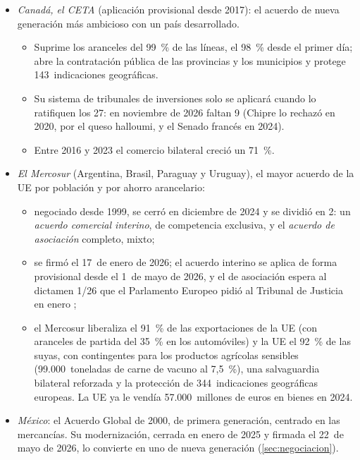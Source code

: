 \documentclass[11pt]{article}
\begin{document}
\begin{itemize}
\item \emph{Canadá, el CETA} (aplicación provisional desde 2017): el acuerdo de nueva generación más ambicioso con un país desarrollado.
  \begin{itemize}
  \item Suprime los aranceles del 99~\% de las líneas, el 98~\% desde el primer día; abre la contratación pública de las provincias y los municipios y protege 143~indicaciones geográficas.
  \item Su sistema de tribunales de inversiones solo se aplicará cuando lo ratifiquen los 27: en noviembre de 2026 faltan 9 (Chipre lo rechazó en 2020, por el queso halloumi, y el Senado francés en 2024)\nocite{CE2026CETA}.
  \item Entre 2016 y 2023 el comercio bilateral creció un 71~\%\nocite{CE2026Informe}.
  \end{itemize}
\item \emph{El Mercosur} (Argentina, Brasil, Paraguay y Uruguay), el mayor acuerdo de la UE por población y por ahorro arancelario:
  \begin{itemize}
  \item negociado desde 1999, se cerró en diciembre de 2024 y se dividió en 2: un \emph{acuerdo comercial interino}, de competencia exclusiva, y el \emph{acuerdo de asociación} completo, mixto;
  \item se firmó el 17~de enero de 2026; el acuerdo interino se aplica de forma provisional desde el 1~de mayo de 2026\nocite{CE2026MercosurProvisional}, y el de asociación espera al dictamen 1/26 que el Parlamento Europeo pidió al Tribunal de Justicia en enero\nocite{PE2026Mercosur} ;
  \item el Mercosur liberaliza el 91~\% de las exportaciones de la UE (con aranceles de partida del 35~\% en los automóviles) y la UE el 92~\% de las suyas, con contingentes para los productos agrícolas sensibles (99.000~toneladas de carne de vacuno al 7,5~\%), una salvaguardia bilateral reforzada y la protección de 344~indicaciones geográficas europeas\nocite{CE2026MercosurAcuerdo}. La UE ya le vendía 57.000~millones de euros en bienes en 2024.
  \end{itemize}
\item \emph{México}: el Acuerdo Global de 2000, de primera generación, centrado en las mercancías. Su modernización, cerrada en enero de 2025 y firmada el 22~de mayo de 2026, lo convierte en uno de nueva generación (\ref{sec:negociacion})\nocite{CE2026Mexico}.

\end{itemize}
\end{document}
